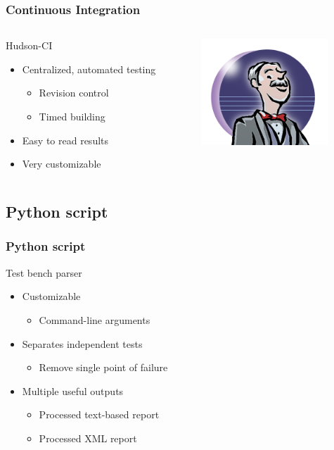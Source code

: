 \documentclass[british,10pt]{beamer}
\begin{document}
\begin{frame}\frametitle{Continuous Integration}
\begin{columns}
\begin{column}{0.6\textwidth}
Hudson-CI
\begin{itemize}
\item Centralized, automated testing
\begin{itemize}
\item Revision control
\item Timed building
\end{itemize}
\item Easy to read results
\item Very customizable
\end{itemize}
\end{column}
\includegraphics[width=0.8\textwidth]{images/hudson.png}
\end{columns}
\end{frame}

\subsection{Python script}

\begin{frame}\frametitle{Python script}
Test bench parser
\begin{itemize}
\item Customizable
\begin{itemize}
\item Command-line arguments
\end{itemize}
\item Separates independent tests
\begin{itemize}
\item Remove single point of failure
\end{itemize}
\item Multiple useful outputs
\begin{itemize}
\item Processed text-based report
\item Processed XML report
\end{itemize}
\end{itemize}
\end{frame}
\end{document}
